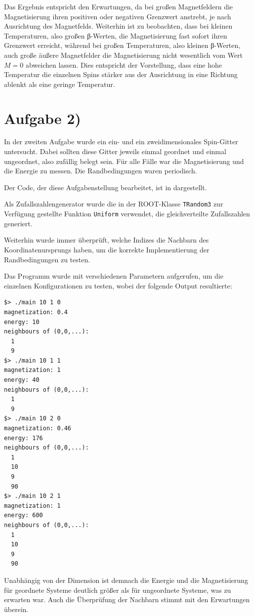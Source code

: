 Das Ergebnis entspricht den Erwartungen, da bei großen Magnetfeldern die Magnetisierung
ihren positiven oder negativen Grenzwert anstrebt, je nach Ausrichtung des Magnetfelds.
Weiterhin ist zu beobachten, dass bei kleinen Temperaturen, also großen β-Werten,
die Magnetisierung fast sofort ihren Grenzwert erreicht, während bei großen Temperaturen,
also kleinen β-Werten, auch große äußere Magnetfelder die Magnetisierung nicht 
wesentlich vom Wert $M=0$ abweichen lassen. Dies entspricht der Vorstellung, dass
eine hohe Temperatur die einzelnen Spins stärker aus der Ausrichtung in eine
Richtung ablenkt als eine geringe Temperatur.

\section*{Aufgabe 2)}

In der zweiten Aufgabe wurde ein ein- und ein zweidimensionales Spin-Gitter untersucht.
Dabei sollten diese Gitter jeweils einmal geordnet und einmal ungeordnet, also
zufällig belegt sein. Für alle Fälle war die Magnetisierung und die Energie zu messen.
Die Randbedingungen waren periodisch.

Der Code, der diese Aufgabenstellung bearbeitet, ist in  dargestellt.



Als Zufallszahlengenerator wurde die in der ROOT-Klasse \texttt{TRandom3} zur
Verfügung gestellte Funktion \texttt{Uniform} verwendet, die gleichverteilte Zufallszahlen
generiert.

Weiterhin wurde immer überprüft, welche Indizes die Nachbarn des Koordinatenursprungs haben,
um die korrekte Implementierung der Randbedingungen zu testen.

Das Programm wurde mit verschiedenen Parametern aufgerufen, um die einzelnen
Konfigurationen zu testen, wobei der folgende Output resultierte:

\begin{lstlisting}[caption=Aufruf und Output von \lref{main},label=lst:output]
$> ./main 10 1 0
magnetization: 0.4
energy: 10
neighbours of (0,0,...):
  1
  9
$> ./main 10 1 1
magnetization: 1
energy: 40
neighbours of (0,0,...):
  1
  9
$> ./main 10 2 0
magnetization: 0.46
energy: 176
neighbours of (0,0,...):
  1
  10
  9
  90
$> ./main 10 2 1
magnetization: 1
energy: 600
neighbours of (0,0,...):
  1
  10
  9
  90
\end{lstlisting}
Unabhängig von der Dimension ist demnach die Energie und die Magnetisierung für
geordnete Systeme deutlich größer als für ungeordnete Systeme, was zu erwarten
war. Auch die Überprüfung der Nachbarn stimmt mit den Erwartungen überein. 